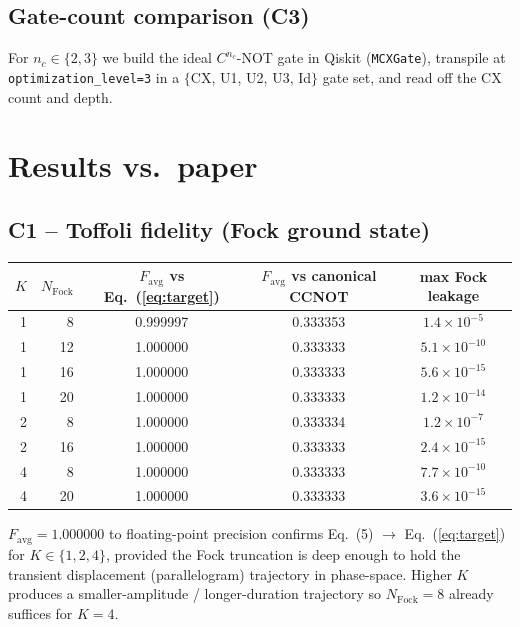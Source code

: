 \documentclass[11pt]{article}
\begin{document}
\subsection*{Gate-count comparison (C3)}

For $n_c \in \{2,3\}$ we build the ideal $C^{n_c}$-NOT gate in Qiskit
(\verb|MCXGate|), transpile at \verb|optimization_level=3| in a
$\{$CX, U1, U2, U3, Id$\}$ gate set, and read off the CX count and depth.

\section{Results vs.\ paper}

\subsection*{C1 -- Toffoli fidelity (Fock ground state)}

\begin{center}
\begin{tabular}{@{}rrccc@{}}
\toprule
$K$ & $N_\mathrm{Fock}$ & $F_\mathrm{avg}$ vs Eq.~(\ref{eq:target}) &
     $F_\mathrm{avg}$ vs canonical CCNOT & max Fock leakage \\
\midrule
1 & 8  & 0.999997 & 0.333353 & $1.4\times10^{-5}$ \\
1 & 12 & 1.000000 & 0.333333 & $5.1\times10^{-10}$ \\
1 & 16 & 1.000000 & 0.333333 & $5.6\times10^{-15}$ \\
1 & 20 & 1.000000 & 0.333333 & $1.2\times10^{-14}$ \\
2 & 8  & 1.000000 & 0.333334 & $1.2\times10^{-7}$ \\
2 & 16 & 1.000000 & 0.333333 & $2.4\times10^{-15}$ \\
4 & 8  & 1.000000 & 0.333333 & $7.7\times10^{-10}$ \\
4 & 20 & 1.000000 & 0.333333 & $3.6\times10^{-15}$ \\
\bottomrule
\end{tabular}
\end{center}

$F_\mathrm{avg} = 1.000000$ to floating-point precision confirms Eq.~(5) $\to$
Eq.~(\ref{eq:target}) for $K\in\{1,2,4\}$, provided the Fock truncation is deep
enough to hold the transient displacement (parallelogram) trajectory in
phase-space. Higher $K$ produces a smaller-amplitude / longer-duration trajectory
so $N_\mathrm{Fock}=8$ already suffices for $K=4$.
\end{document}

